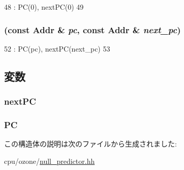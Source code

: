 \begin{DoxyCode}
48             : PC(0), nextPC(0)
49         { }
\end{DoxyCode}
\hypertarget{structNullPredictor_1_1BPredInfo_a65c8237055534423926471b7d0cdb492}{
\subsubsection[{BPredInfo}]{ (const {\bf Addr} \& {\em pc}, \/  const {\bf Addr} \& {\em next\_\-pc})}}
\label{structNullPredictor_1_1BPredInfo_a65c8237055534423926471b7d0cdb492}



\begin{DoxyCode}
52             : PC(pc), nextPC(next_pc)
53         { }
\end{DoxyCode}


\subsection{変数}
\hypertarget{structNullPredictor_1_1BPredInfo_a3bda64c96331af0ad914c5873b7074b5}{
\subsubsection[{nextPC}]{ {\bf nextPC}}}
\label{structNullPredictor_1_1BPredInfo_a3bda64c96331af0ad914c5873b7074b5}
\hypertarget{structNullPredictor_1_1BPredInfo_ab4fee9d7e100be71a104b4b714909357}{
\subsubsection[{PC}]{ {\bf PC}}}
\label{structNullPredictor_1_1BPredInfo_ab4fee9d7e100be71a104b4b714909357}


この構造体の説明は次のファイルから生成されました:\begin{DoxyCompactItemize}
\item 
cpu/ozone/\hyperlink{null__predictor_8hh}{null\_\-predictor.hh}\end{DoxyCompactItemize}
